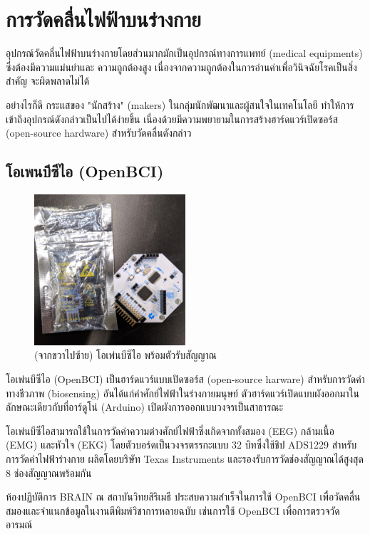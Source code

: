 \section{การวัดคลื่นไฟฟ้าบนร่างกาย}

อุปกรณ์วัดคลื่นไฟฟ้าบนร่างกายโดยส่วนมากมักเป็นอุปกรณ์ทางการแพทย์ (medical equipments) ซึ่งต้องมีความแม่นยำและ
ความถูกต้องสูง เนื่องจากความถูกต้องในการอ่านค่าเพื่อวินิจฉัยโรคเป็นสิ่งสำคัญ จะผิดพลาดไม่ได้

อย่างไรก็ดี กระแสของ "นักสร้าง" (makers) ในกลุ่มนักพัฒนาและผู้สนใจในเทคโนโลยี ทำให้การเข้าถึงอุปกรณ์ดังกล่าวเป็นไปได้ง่ายขึ้น
เนื่องด้วยมีความพยายามในการสร้างฮาร์ดแวร์เปิดซอร์ส (open-source hardware) สำหรับวัดคลื่นดังกล่าว

\subsection{โอเพนบีซีไอ (OpenBCI)}

\begin{figure}[h]
    \centering
    \includegraphics[width=0.5\textwidth]{images/IMG_20190620_155530.jpg}
    \caption{(จากขวาไปซ้าย) โอเพ่นบีซีไอ พร้อมตัวรับสัญญาณ}
\end{figure}

โอเพ่นบีซีไอ (OpenBCI) เป็นฮาร์ดแวร์แบบเปิดซอร์ส (open-source harware) สำหรับการวัดค่าทางชีวภาพ (biosensing)
อันได้แก่ค่าศักย์ไฟฟ้าในร่างกายมนุษย์ ตัวฮาร์ดแวร์เปิดแบบผังออกมาในลักษณะเดียวกับที่อาร์ดูโน่ (Arduino)
เปิดผังการออกแบบวงจรเป็นสาธารณะ

โอเพ่นบีซีไอสามารถใช้ในการวัดค่าความต่างศักย์ไฟฟ้าซึ่งเกิดจากทั้งสมอง (EEG) กล้ามเนื้อ (EMG) และหัวใจ (EKG)
โดยตัวบอร์ดเป็นวงจรตรรกะแบบ 32 บิทซึ่งใช้ชิป ADS1229 สำหรับการวัดค่าไฟฟ้าร่างกาย ผลิตโดยบริษัท Texas Instruments
และรองรับการวัดช่องสัญญาณได้สูงสุด 8 ช่องสัญญาณพร้อมกัน

ห้องปฏิบัติการ BRAIN ณ สถาบันวิทยสิริเมธี ประสบความสำเร็จในการใช้ OpenBCI เพื่อวัดคลื่นสมองและจำแนกข้อมูลในงานตีพิมพ์วิชาการหลายฉบับ เช่นการใช้ OpenBCI เพื่อการตรวจวัดอารมณ์ \cite{edose}

